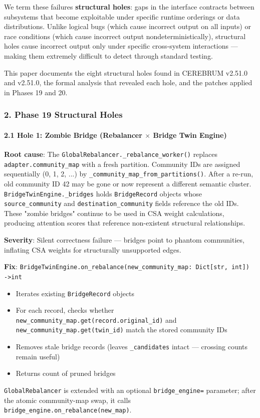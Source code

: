 We term these failures \textbf{structural holes}: gaps in the interface contracts between subsystems that become exploitable under specific runtime orderings or data distr\-ibutions. Unlike logical bugs (which cause incorrect output on all inputs) or race conditions (which cause incorrect output nonde\-terministi\-cally), structural holes cause incorrect output only under specific cross-system inter\-actions — making them extremely difficult to detect through standard testing.

This paper documents the eight structural holes found in CEREBRUM v2.51.0 and v2.51.0, the formal analysis that revealed each hole, and the patches applied in Phases 19 and 20.

\subsubsection{2. Phase 19 Structural Holes}

\paragraph{2.1 Hole 1: Zombie Bridge (Rebalancer $\times$ Bridge Twin Engine)}

\textbf{Root cause}: The \texttt{GlobalRebalancer.\_rebalance\_worker()} replaces \texttt{adapter.community\_map} with a fresh partition. Community IDs are assigned seque\-ntially (0, 1, 2, ...) by \texttt{\_community\_map\_from\_partitions()}. After a re-run, old community ID 42 may be gone or now represent a different semantic cluster. \texttt{BridgeTwinEngine.\_bridges} holds \texttt{BridgeRecord} objects whose \texttt{source\_community} and \texttt{destination\_community} fields reference the old IDs. These "zombie bridges" continue to be used in CSA weight calcu\-lations, producing attention scores that reference non-existent structural relat\-ionships.

\textbf{Severity}: Silent correctness failure — bridges point to phantom communities, inflating CSA weights for struc\-turally unsupported edges.

\textbf{Fix}: \texttt{BridgeTwinEngine.on\_rebalance(new\_community\_map: Dict[str, int]) -\textgreater  int}
\begin{itemize}
\item Iterates existing \texttt{BridgeRecord} objects
\item For each record, checks whether \texttt{new\_community\_map.get(record.original\_id)} and \texttt{new\_community\_map.get(twin\_id)} match the stored community IDs
\item Removes stale bridge records (leaves \texttt{\_candidates} intact — crossing counts remain useful)
\item Returns count of pruned bridges

\end{itemize}
\texttt{GlobalRebalancer} is extended with an optional \texttt{bridge\_engine=} parameter; after the atomic community-map swap, it calls \texttt{bridge\_engine.on\_rebalance(new\_map)}.

